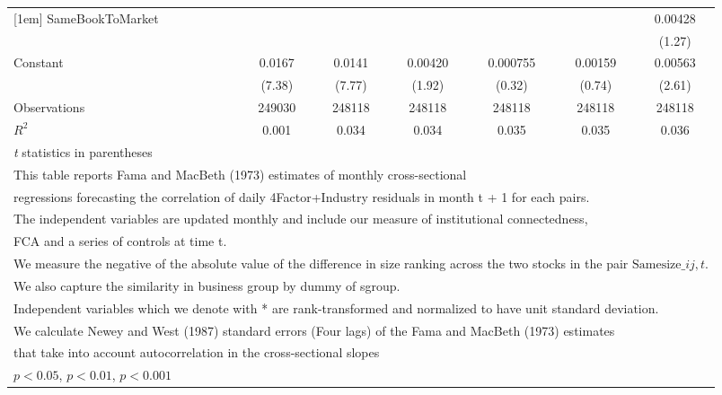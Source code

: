 {\begin{tabular}{l*{6}{c}}
[1em]
SameBookToMarket&                  &                  &                  &                  &                  &  0.00428         \\
                &                  &                  &                  &                  &                  &   (1.27)         \\
[1em]
Constant        &   0.0167\sym{***}&   0.0141\sym{***}&  0.00420         & 0.000755         &  0.00159         &  0.00563\sym{*}  \\
                &   (7.38)         &   (7.77)         &   (1.92)         &   (0.32)         &   (0.74)         &   (2.61)         \\
\hline
Observations    &   249030         &   248118         &   248118         &   248118         &   248118         &   248118         \\
\(R^{2}\)       &    0.001         &    0.034         &    0.034         &    0.035         &    0.035         &    0.036         \\
\hline\hline
\multicolumn{7}{l}{\footnotesize \textit{t} statistics in parentheses}\\
\multicolumn{7}{l}{\footnotesize This table reports Fama and MacBeth (1973) estimates of monthly cross-sectional}\\
\multicolumn{7}{l}{\footnotesize  regressions forecasting the correlation of daily 4Factor+Industry residuals in month t + 1 for each pairs.}\\
\multicolumn{7}{l}{\footnotesize The independent variables are updated monthly and include our measure of institutional connectedness,}\\
\multicolumn{7}{l}{\footnotesize  FCA and a series of controls at time t.}\\
\multicolumn{7}{l}{\footnotesize We measure the negative of the absolute value of the difference in size ranking across the two stocks in the pair $ \text{Samesize}\_{ij,t} $.}\\
\multicolumn{7}{l}{\footnotesize We also capture the similarity in business group by dummy of sgroup.}\\
\multicolumn{7}{l}{\footnotesize Independent variables which  we denote with * are rank-transformed and normalized to have unit standard deviation.}\\
\multicolumn{7}{l}{\footnotesize  We calculate Newey and West (1987) standard errors (Four lags) of the Fama and MacBeth (1973) estimates }\\
\multicolumn{7}{l}{\footnotesize  that take into account autocorrelation in the cross-sectional slopes}\\
\multicolumn{7}{l}{\footnotesize \sym{*} \(p<0.05\), \sym{**} \(p<0.01\), \sym{***} \(p<0.001\)}\\
\end{tabular}
}
